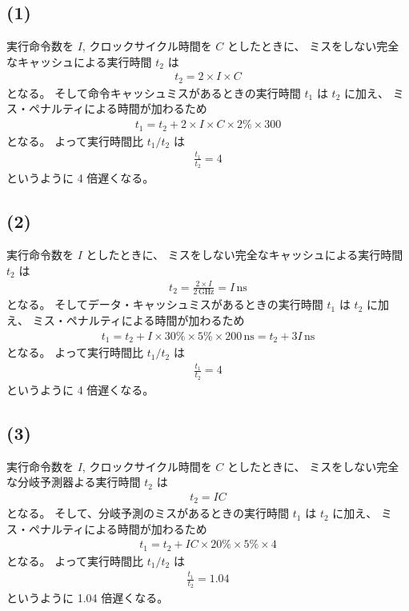 \documentclass[11pt,dvipdfmx,a4paper]{jsarticle}
\begin{document}
\subsection*{(1)}
実行命令数を \(I\), クロックサイクル時間を \(C\) としたときに、
ミスをしない完全なキャッシュによる実行時間 \(t_2\) は
\begin{align*}
    t_2 = 2 \times I \times C
\end{align*}
となる。
そして命令キャッシュミスがあるときの実行時間 \(t_1\) は \(t_2\) に加え、
ミス・ペナルティによる時間が加わるため
\begin{align*}
    t_1 = t_2 + 2 \times I \times C \times 2\% \times 300
\end{align*}
となる。
よって実行時間比 \(t_1/t_2\) は
\begin{align*}
    \frac{t_1}{t_2} = 4
\end{align*}
というように 4 倍遅くなる。

\subsection*{(2)}
実行命令数を \(I\) としたときに、
ミスをしない完全なキャッシュによる実行時間 \(t_2\) は
\begin{align*}
    t_2 = \frac{2 \times I}{2\,\text{GHz}} = I \,\text{ns}
\end{align*}
となる。
そしてデータ・キャッシュミスがあるときの実行時間 \(t_1\) は \(t_2\) に加え、
ミス・ペナルティによる時間が加わるため
\begin{align*}
    t_1 = t_2 + I \times 30 \% \times 5 \% \times 200\,\text{ns}
        = t_2 + 3I\,\text{ns}
\end{align*}
となる。
よって実行時間比 \(t_1/t_2\) は
\begin{align*}
    \frac{t_1}{t_2} = 4
\end{align*}
というように 4 倍遅くなる。

\subsection*{(3)}
実行命令数を \(I\), クロックサイクル時間を \(C\) としたときに、
ミスをしない完全な分岐予測器よる実行時間 \(t_2\) は
\begin{align*}
    t_2 = IC
\end{align*}
となる。
そして、分岐予測のミスがあるときの実行時間 \(t_1\) は \(t_2\) に加え、
ミス・ペナルティによる時間が加わるため
\begin{align*}
    t_1 = t_2 + IC \times 20\% \times 5\% \times 4
\end{align*}
となる。
よって実行時間比 \(t_1/t_2\) は
\begin{align*}
    \frac{t_1}{t_2} = 1.04
\end{align*}
というように 1.04 倍遅くなる。
\end{document}
